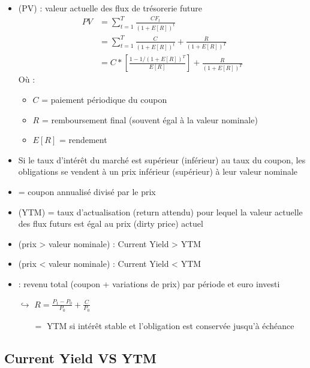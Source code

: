 \begin{itemize}
    \item {} (PV) : valeur actuelle des flux de trésorerie future
    \begin{align*}
        PV &= \sum_{t = 1}^T \frac{CF_t}{(1+E[R])^t}\\
           &= \sum_{t=1}^T \frac{C}{(1+E[R])^t} + \frac{R}{(1 + E[R])^T}\\
           &= C * \left[ \frac{1 - 1/(1+E[R])^T}{E[R]} \right] + \frac{R}{(1 + E[R])^T}
    \end{align*}
    Où :
    \begin{itemize}
        \item $C$ = paiement périodique du coupon
        \item $R$ = remboursement final (souvent égal à la valeur nominale)
        \item $E[R]$ = rendement
    \end{itemize}
    \item Si le taux d'intérêt du marché est supérieur (inférieur) au taux du coupon, les obligations se vendent à un prix inférieur (supérieur) à leur valeur nominale
    \item {} = coupon annualisé divisé par le prix
    \item {} (YTM) = taux d'actualisation (return attendu) pour lequel la valeur actuelle des flux futurs est égal au prix (dirty price) actuel
    \item {} (prix > valeur nominale) : Current Yield > YTM
    \item {} (prix < valeur nominale) : Current Yield < YTM
    \item {} : revenu total (coupon + variations de prix) par période et euro investi
    \item[$\hookrightarrow$] $R = \frac{P_1 - P_0}{P_0} + \frac{C}{P_0}$
    \begin{itemize}
        \item[$=$] YTM si intérêt stable et l'obligation est conservée jusqu'à échéance
    \end{itemize}
\end{itemize}

\subsection{Current Yield VS YTM}

